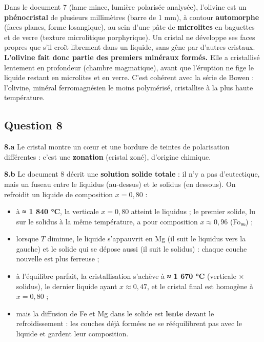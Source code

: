 \documentclass[11pt,a4paper]{article}
\providecommand{\tightlist}{\setlength{\itemsep}{0pt}\setlength{\parskip}{0pt}}
\begin{document}
Dans le document 7 (lame mince, lumière polarisée analysée), l'olivine est un \textbf{phénocristal} de plusieurs millimètres (barre de 1 mm), à contour \textbf{automorphe} (faces planes, forme losangique), au sein d'une pâte de \textbf{microlites} en baguettes et de verre (texture microlitique porphyrique). Un cristal ne développe ses faces propres que s'il croît librement dans un liquide, sans gêne par d'autres cristaux. \textbf{L'olivine fait donc partie des premiers minéraux formés.} Elle a cristallisé lentement en profondeur (chambre magmatique), avant que l'éruption ne fige le liquide restant en microlites et en verre. C'est cohérent avec la série de Bowen : l'olivine, minéral ferromagnésien le moins polymérisé, cristallise à la plus haute température.

\hypertarget{question-8}{%
\subsection{Question 8}\label{question-8}}

\textbf{8.a} Le cristal montre un cœur et une bordure de teintes de polarisation différentes : c'est une \textbf{zonation} (cristal zoné), d'origine chimique.

\textbf{8.b} Le document 8 décrit une \textbf{solution solide totale} : il n'y a pas d'eutectique, mais un fuseau entre le liquidus (au-dessus) et le solidus (en dessous). On refroidit un liquide de composition \(x = 0{,}80\) :

\begin{itemize}
\tightlist
\item
  à \textbf{≈ 1 840 °C}, la verticale \(x = 0{,}80\) atteint le liquidus ; le premier solide, lu sur le solidus à la même température, a pour composition \textbf{\(x \approx 0{,}96\)} (Fo₉₆) ;
\item
  lorsque \(T\) diminue, le liquide s'appauvrit en Mg (il suit le liquidus vers la gauche) et le solide qui se dépose aussi (il suit le solidus) : chaque couche nouvelle est plus ferreuse ;
\item
  à l'équilibre parfait, la cristallisation s'achève à \textbf{≈ 1 670 °C} (verticale × solidus), le dernier liquide ayant \(x \approx 0{,}47\), et le cristal final est homogène à \(x = 0{,}80\) ;
\item
  mais la diffusion de Fe et Mg dans le solide est \textbf{lente} devant le refroidissement : les couches déjà formées ne se rééquilibrent pas avec le liquide et gardent leur composition.
\end{itemize}
\end{document}
